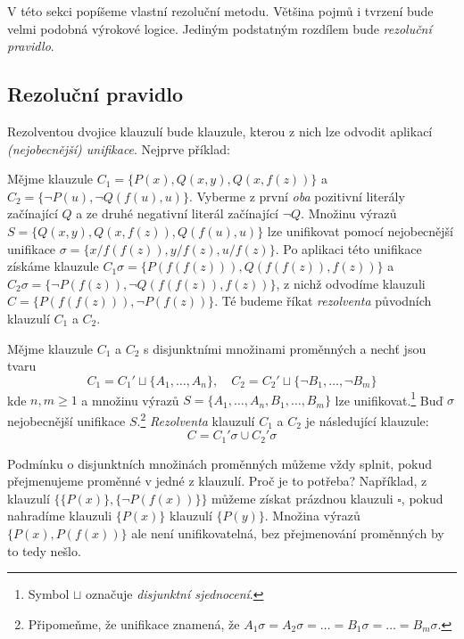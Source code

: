 V této sekci popíšeme vlastní rezoluční metodu. Většina pojmů i tvrzení bude velmi podobná výrokové logice. Jediným podstatným rozdílem bude \emph{rezoluční pravidlo}.


\subsection{Rezoluční pravidlo}

Rezolventou dvojice klauzulí bude klauzule, kterou z nich lze odvodit aplikací \emph{(nejobecnější) unifikace}. Nejprve příklad:

\begin{example}
Mějme klauzule $C_1=\{P(x),Q(x,y),Q(x,f(z))\}$ a $C_2=\{\neg P(u),\neg Q(f(u),u)\}$. Vyberme z první \emph{oba} pozitivní literály začínající $Q$ a ze druhé negativní literál začínající $\neg Q$. Množinu výrazů $S=\{Q(x,y),Q(x,f(z)),Q(f(u),u)\}$ lze unifikovat pomocí nejobecnější unifikace $\sigma=\{x/f(f(z)),y/f(z),u/f(z)\}$. Po aplikaci této unifikace získáme klauzule $C_1\sigma=\{P(f(f(z))),Q(f(f(z)),f(z))\}$ a $C_2\sigma=\{\neg P(f(z)),\neg Q(f(f(z)),f(z))\}$, z nichž odvodíme klauzuli $C=\{P(f(f(z))),\neg P(f(z))\}$. Té budeme říkat \emph{rezolventa} původních klauzulí $C_1$ a $C_2$.
\end{example}

\begin{definition}
    Mějme klauzule $C_1$ a $C_2$ s disjunktními množinami proměnných a nechť jsou tvaru
    $$
    C_1=C_1'\sqcup \{A_1,\dots,A_n\},\quad C_2=C_2'\sqcup \{\neg B_1,\dots,\neg B_m\}
    $$
    kde $n,m\ge 1$ a množinu výrazů $S=\{A_1,\dots,A_n,B_1,\dots,B_m\}$ lze unifikovat.\footnote{Symbol $\sqcup$ označuje \emph{disjunktní sjednocení}.} Buď $\sigma$ nejobecnější unifikace $S$.\footnote{Připomeňme, že unifikace znamená, že $A_1\sigma=A_2\sigma=\dots=B_1\sigma=\dots=B_m\sigma$.} \emph{Rezolventa} klauzulí $C_1$ a $C_2$ je následující klauzule:
    $$
    C=C_1'\sigma \cup C_2'\sigma
    $$
\end{definition}

\begin{remark}\label{remark:resolution-step-rename}
    Podmínku o disjunktních množinách proměnných můžeme vždy splnit, pokud přejmenujeme proměnné v jedné z klauzulí. Proč je to potřeba? Například, z klauzulí $\{\{P(x)\},\{\neg P(f(x))\}\}$ můžeme získat prázdnou klauzuli $\square$, pokud nahradíme klauzuli $\{P(x)\}$ klauzulí $\{P(y)\}$. Množina výrazů $\{P(x),P(f(x))\}$ ale není unifikovatelná, bez přejmenování proměnných by to tedy nešlo.
\end{remark}


